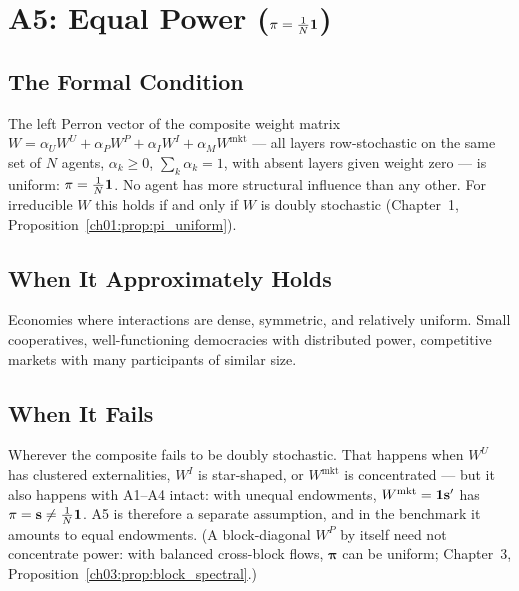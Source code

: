 \documentclass[../structural_economics_book.tex]{subfiles}
\begin{document}
\section{A5: Equal Power (\texorpdfstring{$\pi = \frac{1}{N}\mathbf{1}$}{pi = 1/N})}
\label{ch04:sec:A5}

\subsection{The Formal Condition}

The left Perron vector of the composite weight matrix $W = \alpha_U W^U + \alpha_P W^P + \alpha_I W^I + \alpha_M W^{\text{mkt}}$ --- all layers row-stochastic on the same set of $N$ agents, $\alpha_k \ge 0$, $\sum_k\alpha_k = 1$, with absent layers given weight zero --- is uniform: $\pi = \frac{1}{N}\mathbf{1}$. No agent has more structural influence than any other. For irreducible $W$ this holds if and only if $W$ is doubly stochastic (Chapter~1, Proposition~\ref{ch01:prop:pi_uniform}).

\subsection{When It Approximately Holds}

Economies where interactions are dense, symmetric, and relatively uniform. Small cooperatives, well-functioning democracies with distributed power, competitive markets with many participants of similar size.

\subsection{When It Fails}

Wherever the composite fails to be doubly stochastic. That happens when $W^U$ has clustered externalities, $W^I$ is star-shaped, or $W^{\text{mkt}}$ is concentrated --- but it also happens with A1--A4 intact: with unequal endowments, $W^{\text{mkt}} = \mathbf{1}\mathbf{s}'$ has $\pi = \mathbf{s} \neq \frac{1}{N}\mathbf{1}$. A5 is therefore a separate assumption, and in the benchmark it amounts to equal endowments. (A block-diagonal $W^P$ by itself need not concentrate power: with balanced cross-block flows, $\boldsymbol{\pi}$ can be uniform; Chapter~3, Proposition~\ref{ch03:prop:block_spectral}.)
\end{document}
